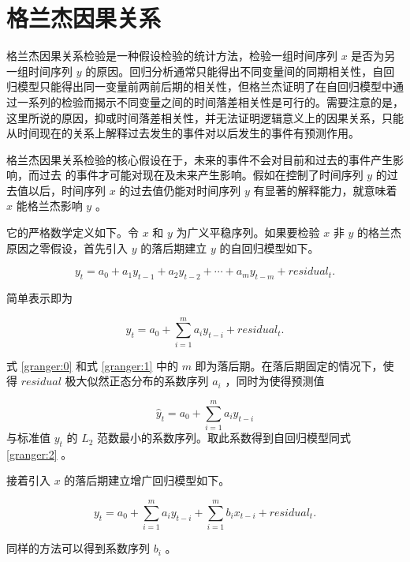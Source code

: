 \section{格兰杰因果关系}

格兰杰因果关系检验\cite{granger_causality}是一种假设检验的统计方法，检验一组时间序列 $x$ 是否为另一组时间序列 $y$ 的原因。回归分析通常只能得出不同变量间的同期相关性，自回归模型只能得出同一变量前两前后期的相关性，但格兰杰证明了在自回归模型中通过一系列的检验而揭示不同变量之间的时间落差相关性是可行的。需要注意的是，这里所说的原因，抑或时间落差相关性，并无法证明逻辑意义上的因果关系，只能从时间现在的关系上解释过去发生的事件对以后发生的事件有预测作用。

格兰杰因果关系检验的核心假设在于，未来的事件不会对目前和过去的事件产生影响，而过去
的事件才可能对现在及未来产生影响。假如在控制了时间序列 $y$ 的过去值以后，时间序列 $x$ 的过去值仍能对时间序列 $y$ 有显著的解释能力，就意味着 $x$ 能格兰杰影响 $y$ 。

它的严格数学定义如下。令 $x$ 和 $y$ 为广义平稳序列。如果要检验 $x$ 非 $y$ 的格兰杰原因之零假设，首先引入 $y$ 的落后期建立 $y$ 的自回归模型如下。

\begin{equation}
  \label{granger:0}
  y_{t}=a_{0}+a_{1}y_{t-1}+a_{2}y_{t-2}+\cdots+a_{m}y_{t-m}+residual_{t}.
\end{equation}

简单表示即为

\begin{equation}
  \label{granger:1}
  y_{t}=a_{0}+\sum_{i=1}^{m}a_{i}y_{t-i}+residual_{t}.
\end{equation}

式 \ref{granger:0} 和式 \ref{granger:1} 中的 $m$ 即为落后期。在落后期固定的情况下，使得 $residual$ 极大似然正态分布的系数序列 $a_{i}$ ，同时为使得预测值

\begin{equation}
  \label{granger:2}
  \hat{y}_{t}=a_{0}+\sum_{i=1}^{m}a_{i}y_{t-i}
\end{equation}
与标准值 $y_{t}$ 的 $L_{2}$ 范数最小的系数序列。取此系数得到自回归模型同式 \ref{granger:2} 。

接着引入 $x$ 的落后期建立增广回归模型如下。

\begin{equation}
  \label{granger:3}
  y_{t}=a_{0}+\sum_{i=1}^{m}a_{i}y_{t-i}+\sum_{i=1}^{m}b_{i}x_{t-i}+residual_{t}.
\end{equation}

同样的方法可以得到系数序列 $b_{i}$ 。


